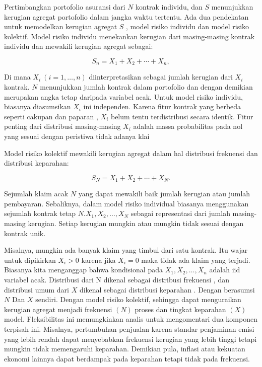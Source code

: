 \documentclass[
]{book}
\begin{document}
Pertimbangkan portofolio asuransi dari \(N\) kontrak individu, dan \(S\) menunjukkan kerugian agregat portofolio dalam jangka waktu tertentu. Ada dua pendekatan untuk memodelkan kerugian agregat \(S\) , model risiko individu dan model risiko kolektif. Model risiko individu menekankan kerugian dari masing-masing kontrak individu dan mewakili kerugian agregat sebagai:

\[S_n=X_1 +X_2 +\cdots+X_n,\]

Di mana \(X_i~(i=1,\ldots,n)\) diinterpretasikan sebagai jumlah kerugian dari \(X_i\) kontrak. \(N\) menunjukkan jumlah kontrak dalam portofolio dan dengan demikian merupakan angka tetap daripada variabel acak. Untuk model risiko individu, biasanya diasumsikan \(X_i\) ini independen. Karena fitur kontrak yang berbeda seperti cakupan dan paparan , \(X_i\) belum tentu terdistribusi secara identik. Fitur penting dari distribusi masing-masing \(X_i\) adalah massa probabilitas pada nol yang sesuai dengan peristiwa tidak adanya klai

Model risiko kolektif mewakili kerugian agregat dalam hal distribusi frekuensi dan distribusi keparahan:

\[S_N=X_1 +X_2 + \cdots + X_N .\]

Sejumlah klaim acak \(N\) yang dapat mewakili baik jumlah kerugian atau jumlah pembayaran. Sebaliknya, dalam model risiko individual biasanya menggunakan sejumlah kontrak tetap \(N\).\(X_1, X_2, \ldots, X_N\) sebagai representasi dari jumlah masing-masing kerugian. Setiap kerugian mungkin atau mungkin tidak sesuai dengan kontrak unik.

Misalnya, mungkin ada banyak klaim yang timbul dari satu kontrak. Itu wajar untuk dipikirkan \(X_i>0\) karena jika \(X_i=0\) maka tidak ada klaim yang terjadi. Biasanya kita menganggap bahwa kondisional pada \(X_{1},X_{2},\ldots ,X_{n}\) adalah iid variabel acak. Distribusi dari N dikenal sebagai distribusi frekuensi , dan distribusi umum dari \(X\) dikenal sebagai distribusi keparahan . Dengan berasumsi \(N\) Dan \(X\) sendiri. Dengan model risiko kolektif, sehingga dapat menguraikan kerugian agregat menjadi frekuensi \(( N )\) proses dan tingkat keparahan \(( X )\) model. Fleksibilitas ini memungkinkan analis untuk mengomentari dua komponen terpisah ini. Misalnya, pertumbuhan penjualan karena standar penjaminan emisi yang lebih rendah dapat menyebabkan frekuensi kerugian yang lebih tinggi tetapi mungkin tidak memengaruhi keparahan. Demikian pula, inflasi atau kekuatan ekonomi lainnya dapat berdampak pada keparahan tetapi tidak pada frekuensi.
\end{document}

